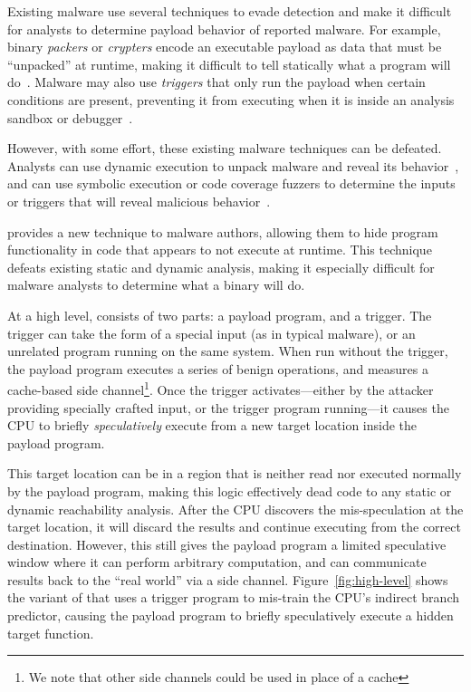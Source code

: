 Existing malware use several techniques to evade detection and
make it difficult for analysts to determine payload behavior of reported malware. 
For example, binary \emph{packers} or \emph{crypters} encode an executable payload as
data that must be ``unpacked'' at runtime, making it difficult to tell
statically what a program will do~\cite{malware-packers}. Malware may also use
\emph{triggers} that only run the payload when certain conditions are present, preventing
it from executing when it is inside an analysis sandbox or 
debugger~\cite{balzarotti2010efficient,red-pill}.

However, with some effort, these existing malware techniques can be defeated.
Analysts can use
dynamic execution to unpack malware and reveal its
behavior~\cite{balzarotti2010efficient}, and can use symbolic execution or code
coverage fuzzers to determine the inputs or triggers that will reveal malicious
behavior~\cite{moser2007exploring,schwartz2010all,wang2017angr,egele2012survey}.


\speculake provides a new technique to malware authors, allowing them to hide
program functionality in code that appears to not execute at runtime. This technique
defeats existing static and dynamic analysis, making it especially difficult for
malware analysts to determine what a binary will do.

\FigHighLevel

At a high level, \speculake consists of two parts: a payload program, and a
trigger. The trigger can take the form of a special input (as in typical
malware), or an unrelated program running on the same system. When run without
the trigger, the payload program executes a series of benign operations, and
measures a cache-based side channel\footnote{We note that other side channels
could be used in place of a cache}. Once the trigger activates---either
by the attacker providing specially crafted input, or the trigger program running---it causes
the CPU to briefly \emph{speculatively} execute from a new target location inside the
payload program.

This target location can be in a region that is neither read
nor executed normally by the payload program, making this logic effectively dead code to
any static or dynamic reachability analysis. After the CPU discovers the
mis-speculation at the target location, it will discard the results and continue
executing from the correct destination. However, this still gives the payload program a
limited speculative window where it can perform arbitrary computation, and can
communicate results back to the ``real world'' via a side
channel. Figure~\ref{fig:high-level} shows the variant of \speculake that uses a
trigger program to mis-train the CPU's indirect branch predictor, causing the
payload program to briefly speculatively execute a hidden target function.


